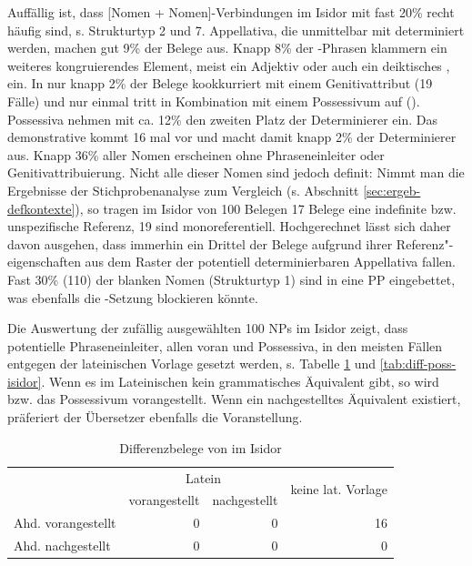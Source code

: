 Auffällig ist, dass [Nomen + Nomen]-Verbindungen im Isidor mit fast 20\% recht häufig sind, s. Strukturtyp 2 und 7. Appellativa, die unmittelbar mit  determiniert werden, machen gut 9\% der Belege aus. Knapp 8\% der -Phrasen klammern ein weiteres kongruierendes Element, meist ein Adjektiv oder auch ein deiktisches , ein. In nur knapp 2\% der Belege kookkurriert  mit einem Genitivattribut (19 Fälle) und nur einmal tritt  in Kombination mit einem Possessivum auf (). Possessiva  nehmen mit ca. 12\% den zweiten Platz der Determinierer ein. Das demonstrative  kommt 16 mal vor und macht damit  knapp 2\% der Determinierer aus. Knapp 36\% aller Nomen erscheinen ohne Phraseneinleiter oder Genitivattribuierung. Nicht alle dieser Nomen sind jedoch definit:  Nimmt man die Ergebnisse der Stichprobenanalyse zum Vergleich (s. Abschnitt \ref{sec:ergeb-defkontexte}), so tragen im Isidor von 100 Belegen 17 Belege eine indefinite bzw. unspezifische Referenz, 19 sind monoreferentiell. Hochgerechnet lässt sich daher davon ausgehen, dass immerhin ein Drittel der Belege aufgrund ihrer Referenz"-eigenschaften aus dem Raster der potentiell determinierbaren Appellativa fallen. Fast 30\% (110) der blanken Nomen (Strukturtyp 1) sind in eine PP eingebettet, was ebenfalls die -Setzung blockieren könnte. 

Die Auswertung der zufällig ausgewählten 100 NPs im Isidor zeigt, dass potentielle Phraseneinleiter, allen voran  und Possessiva, in den meisten Fällen entgegen der lateinischen Vorlage gesetzt werden, s. Tabelle \ref{tab:diff-ther-isidor} und \ref{tab:diff-poss-isidor}. Wenn es im Lateinischen kein grammatisches Äquivalent gibt, so wird  bzw. das Possessivum vorangestellt. Wenn ein nachgestelltes Äquivalent existiert, präferiert der Übersetzer ebenfalls die Voranstellung.

\begin{table}
\centering
\begin{tabular}{@{}lrrr@{}}
\toprule
                   & \multicolumn{2}{c}{Latein} & \multirow{2}{*}{keine lat. Vorlage}\\
 \cmidrule(lr){2-3}
                   & vorangestellt & nachgestellt & \\ \midrule
Ahd. vorangestellt & 0                  & 0                 & 16                    \\
Ahd. nachgestellt  & 0                  & 0                 & 0                    \\ \bottomrule
\end{tabular}
\caption{Differenzbelege von  im Isidor}
\label{tab:diff-ther-isidor}
\end{table}

